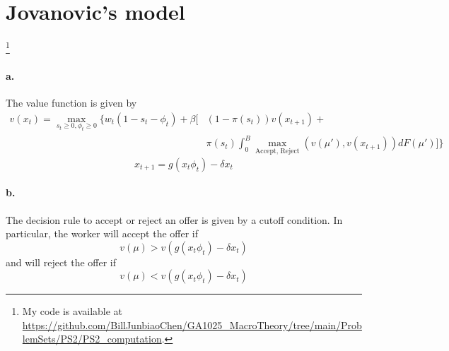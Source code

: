 \documentclass[11pt]{article}
\theoremstyle{definition}
\theoremstyle{boldtitle} %
\numberwithin{equation}{section}
\numberwithin{figure}{section}
\numberwithin{table}{section}
\begin{document}
\section{Jovanovic's model}%
\footnote{
    My code is available at \\ 
    \url{https://github.com/BillJunbiaoChen/GA1025_MacroTheory/tree/main/ProblemSets/PS2/PS2\_computation}.
}
\paragraph{a.} The value function is given by 
\begin{align*}
v(x_t) = \max_{s_t \geq 0, \phi_t \geq 0} \bigg\{
w_t(1 - s_t - \phi_t) + \beta \bigg[
& (1 - \pi(s_t)) v(x_{t+1}) + \\
& \pi (s_t) \int_0^B \max_{\text{Accept, Reject}} (v(\mu'), v(x_{t+1})) dF(\mu')    
\bigg]
\bigg\}
\end{align*}
\[
x_{t+1} = g(x_t \phi_t) - \delta x_t
\]


\paragraph{b.}
The decision rule to accept or reject an offer is given by a cutoff condition.
In particular, 
the worker will accept the offer if
\[
v(\mu) > v( g(x_t \phi_t) - \delta x_t)
\]
and will reject the offer if 
\[
v(\mu) < v( g(x_t \phi_t) - \delta x_t)
\]
\end{document}
